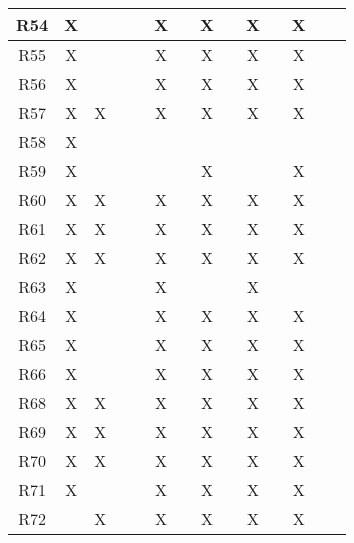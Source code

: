 \begin{table}[H]
\begin{tabular}{|c|c|c|c|c|c|c|c|c|c|c|c|c|c|}
\hline
{\cellcolor[rgb]{0.71,0.102,0}}R54 & X  &    &    &    & X  &    & X  &    & X  &      & X   &      \\ 
\hline
{\cellcolor[rgb]{0.71,0.102,0}}R55 & X  &    &    &    & X  &    & X  &    & X  &      & X   &      \\ 
\hline
{\cellcolor[rgb]{0.71,0.102,0}}R56 & X  &    &    &    & X  &    & X  &    & X  &      & X   &      \\ 
\hline
{\cellcolor[rgb]{0.71,0.102,0}}R57 & X  & X  &    &    & X  &    & X  &    & X  &      & X   &      \\ 
\hline
{\cellcolor[rgb]{0.71,0.102,0}}R58 & X  &    &    &    &    &    &    &    &    &      &     &      \\ 
\hline
{\cellcolor[rgb]{0.71,0.102,0}}R59 & X  &    &    &    &    &    & X  &    &    &      & X   &      \\ 
\hline
{\cellcolor[rgb]{0.71,0.102,0}}R60 & X  & X  &    &    & X  &    & X  &    & X  &      & X   &      \\ 
\hline
{\cellcolor[rgb]{0.71,0.102,0}}R61 & X  & X  &    &    & X  &    & X  &    & X  &      & X   &      \\ 
\hline
{\cellcolor[rgb]{0.71,0.102,0}}R62 & X  & X  &    &    & X  &    & X  &    & X  &      & X   &      \\ 
\hline
{\cellcolor[rgb]{0.71,0.102,0}}R63 & X  &    &    &    & X  &    &    &    & X  &      &     &      \\ 
\hline
{\cellcolor[rgb]{0.71,0.102,0}}R64 & X  &    &    &    & X  &    & X  &    & X  &      & X   &      \\ 
\hline
{\cellcolor[rgb]{0.71,0.102,0}}R65 & X  &    &    &    & X  &    & X  &    & X  &      & X   &      \\ 
\hline
{\cellcolor[rgb]{0.71,0.102,0}}R66 & X  &    &    &    & X  &    & X  &    & X  &      & X   &      \\ 
\hline
{\cellcolor[rgb]{0.71,0.102,0}}R68 & X  & X  &    &    & X  &    & X  &    & X  &      & X   &      \\ 
\hline
{\cellcolor[rgb]{0.71,0.102,0}}R69 & X  & X  &    &    & X  &    & X  &    & X  &      & X   &      \\ 
\hline
{\cellcolor[rgb]{0.71,0.102,0}}R70 & X  & X  &    &    & X  &    & X  &    & X  &      & X   &      \\ 
\hline
{\cellcolor[rgb]{0.71,0.102,0}}R71 & X  &    &    &    & X  &    & X  &    & X  &      & X   &      \\ 
\hline
{\cellcolor[rgb]{0.71,0.102,0}}R72 &    & X  &    &    & X  &    & X  &    & X  &      & X   &      \\ 

\end{tabular}
\end{table}
